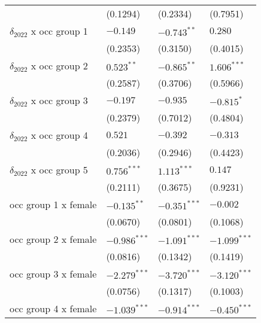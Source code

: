 \begin{tabular}{llll}
                                       &           (0.1294) &           (0.2334) &           (0.7951) \\
$\delta_{2022}$ x occ group 1          &           $-0.149$ &      $-0.743^{**}$ &            $0.280$ \\
                                       &           (0.2353) &           (0.3150) &           (0.4015) \\
$\delta_{2022}$ x occ group 2          &       $0.523^{**}$ &      $-0.865^{**}$ &      $1.606^{***}$ \\
                                       &           (0.2587) &           (0.3706) &           (0.5966) \\
$\delta_{2022}$ x occ group 3          &           $-0.197$ &           $-0.935$ &         $-0.815^*$ \\
                                       &           (0.2379) &           (0.7012) &           (0.4804) \\
$\delta_{2022}$ x occ group 4          &            $0.521$ &           $-0.392$ &           $-0.313$ \\
                                       &           (0.2036) &           (0.2946) &           (0.4423) \\
$\delta_{2022}$ x occ group 5          &      $0.756^{***}$ &      $1.113^{***}$ &            $0.147$ \\
                                       &           (0.2111) &           (0.3675) &           (0.9231) \\
occ group 1 x female                   &      $-0.135^{**}$ &     $-0.351^{***}$ &           $-0.002$ \\
                                       &           (0.0670) &           (0.0801) &           (0.1068) \\
occ group 2 x female                   &     $-0.986^{***}$ &     $-1.091^{***}$ &     $-1.099^{***}$ \\
                                       &           (0.0816) &           (0.1342) &           (0.1419) \\
occ group 3 x female                   &     $-2.279^{***}$ &     $-3.720^{***}$ &     $-3.120^{***}$ \\
                                       &           (0.0756) &           (0.1317) &           (0.1003) \\
occ group 4 x female                   &     $-1.039^{***}$ &     $-0.914^{***}$ &     $-0.450^{***}$ \\

\end{tabular}
